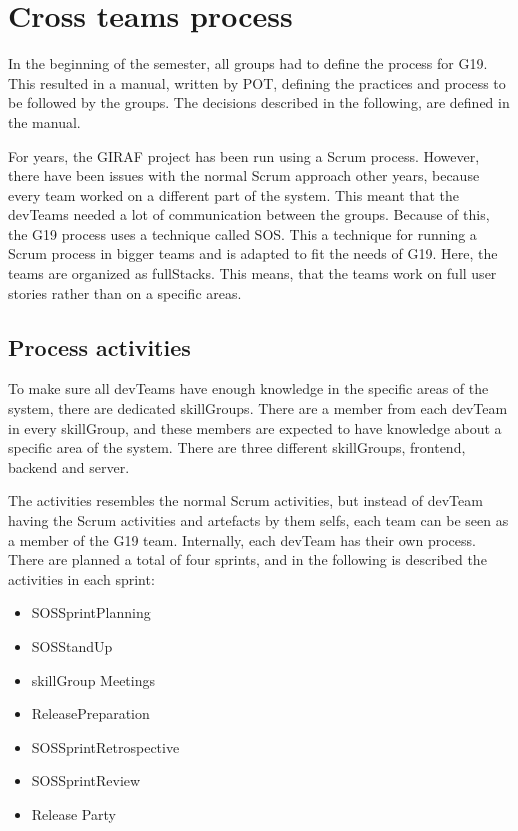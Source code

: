 \section{Cross teams process}
In the beginning of the semester, all groups had to define the process for \gls{G19}. 
This resulted in a manual\cite{processManual}, written by \gls{POT}, defining the practices and process to be followed by the groups. The decisions described in the following, are defined in the manual. 


For years, the GIRAF project has been run using a Scrum process. However, there have been issues with the normal Scrum approach other years, because every team worked on a different part of the system\cite{fullStackVSSpecific}. This meant that the \glspl{devTeam} needed a lot of communication between the groups. Because of this, the \gls{G19} process uses a technique called \gls{SOS}. This a technique for running a Scrum process in bigger teams and is adapted to fit the needs of \gls{G19}.
Here, the teams are organized as \Glspl{fullStack}. This means, that the teams work on full user stories rather than on a specific areas. 

\subsection*{Process activities}

To make sure all \glspl{devTeam} have enough knowledge in the specific areas of the system, there are dedicated \glspl{skillGroup}. There are a member from each \gls{devTeam} in every \gls{skillGroup}, and these members are expected to have knowledge about a specific area of the system. There are three different \glspl{skillGroup}, frontend, backend and server. 

The activities resembles the normal Scrum activities, but instead of \gls{devTeam} having the Scrum activities and artefacts by them selfs, each team can be seen as a member of the \gls{G19} team. Internally, each \gls{devTeam} has their own process. There are planned a total of four sprints, and in the following is described the activities in each sprint:

\begin{itemize}
    \item \Gls{SOSSprintPlanning}
    \item \Gls{SOSStandUp}
    \item \Gls{skillGroup} Meetings
    \item \Gls{ReleasePreparation}
    \item \Gls{SOSSprintRetrospective}
    \item \Gls{SOSSprintReview}
    \item Release Party
\end{itemize}


